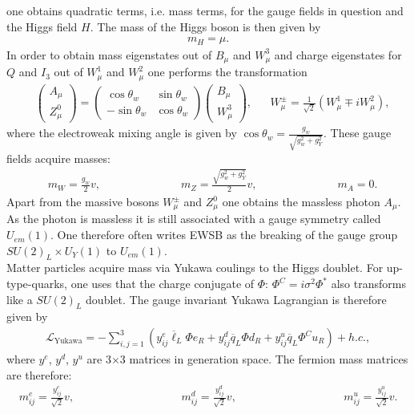 one obtains quadratic terms, i.e. mass terms, for the gauge fields in question and the Higgs field $H$. The mass of the Higgs boson is then given by
\begin{align}
m_H = \mu.
\end{align}
In order to obtain mass eigenstates out of $B_\mu$ and $W_\mu^3$ and charge eigenstates for $Q$ and $I_3$ out of $W_\mu^1$ and $W_\mu^2$ one performs the transformation
\begin{align}
&\begin{pmatrix}
A_\mu \\
Z^0_\mu
\end{pmatrix} = \begin{pmatrix}
\cos \theta_w & \sin \theta_w \\
-\sin \theta_w & \cos \theta_w
\end{pmatrix} \begin{pmatrix}
B_\mu \\
W^3_\mu
\end{pmatrix},
&& W^{\pm}_\mu = \frac{1}{\sqrt{2}}(W^1_\mu \mp i W^2_\mu),
\end{align}
where the electroweak mixing angle is given by $\cos\theta_w = \frac{g_w}{\sqrt{g_w^2 + g_Y^2}}$.
These gauge fields acquire masses:
\begin{align}
& m_W = \frac{g_w}{2} v, \hspace{3cm} m_Z = \frac{\sqrt{g_w^2+g_Y^2}}{2} v, \hspace{3cm} m_A = 0.
\end{align}
Apart from the massive bosons $W^\pm_\mu$ and $Z^0_\mu$ one obtains the massless photon $A_\mu$. As the photon is massless it is still associated with a gauge symmetry called $U_{em}(1)$. One therefore often writes EWSB as the breaking of the gauge group $SU(2)_L \times U_Y(1)$ to $U_{em}(1)$.\\
Matter particles acquire mass via Yukawa coulings to the Higgs doublet. For up-type-quarks, one uses that the charge conjugate of $\Phi$: $\Phi^C = i \sigma^2 \Phi^\ast$ also transforms like a $SU(2)_L$ doublet. The gauge invariant Yukawa Lagrangian is therefore given by
\begin{align}
\mathcal{L}_{\mathrm{Yukawa}} = -\sum_{i,j=1}^3 \left( y_{ij}^e \overline{\ell}_L \Phi e_R  + y_{ij}^d \overline{q}_L \Phi d_R + y_{ij}^u \overline{q}_L \Phi^C u_R\right) + h.c., \label{eq:LYukawa}
\end{align}
where $y^e$, $y^d$, $y^u$ are 3$\times$3 matrices in generation space. The fermion mass matrices are therefore:
\begin{align}
m^e_{ij} = \frac{y^e_{ij}}{\sqrt{2}} v,  \hspace{4cm} m^d_{ij} = \frac{y^d_{ij}}{\sqrt{2}} v, \hspace{4cm} m^u_{ij} = \frac{y^u_{ij}}{\sqrt{2}} v.
\end{align}
